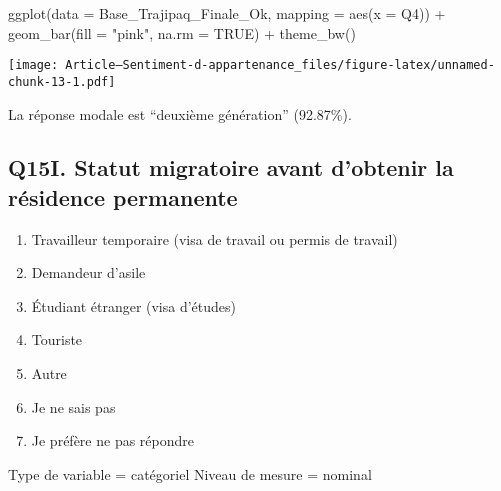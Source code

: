 \documentclass[
]{article}
\newenvironment{Shaded}{\begin{snugshade}}{\end{snugshade}}
\newcommand{\AttributeTok}[1]{\textcolor[rgb]{0.77,0.63,0.00}{#1}}
\newcommand{\ConstantTok}[1]{\textcolor[rgb]{0.00,0.00,0.00}{#1}}
\newcommand{\FunctionTok}[1]{\textcolor[rgb]{0.00,0.00,0.00}{#1}}
\newcommand{\NormalTok}[1]{#1}
\newcommand{\SpecialCharTok}[1]{\textcolor[rgb]{0.00,0.00,0.00}{#1}}
\newcommand{\StringTok}[1]{\textcolor[rgb]{0.31,0.60,0.02}{#1}}
\providecommand{\tightlist}{%
  \setlength{\itemsep}{0pt}\setlength{\parskip}{0pt}}
\begin{document}
\begin{Shaded}
\begin{Highlighting}[]
\FunctionTok{ggplot}\NormalTok{(}\AttributeTok{data =}\NormalTok{ Base\_Trajipaq\_Finale\_Ok, }\AttributeTok{mapping =} \FunctionTok{aes}\NormalTok{(}\AttributeTok{x =}\NormalTok{ Q4)) }\SpecialCharTok{+}
  \FunctionTok{geom\_bar}\NormalTok{(}\AttributeTok{fill =} \StringTok{"pink"}\NormalTok{, }\AttributeTok{na.rm =} \ConstantTok{TRUE}\NormalTok{) }\SpecialCharTok{+}
  \FunctionTok{theme\_bw}\NormalTok{()}
\end{Highlighting}
\end{Shaded}

\texttt{[image: Article---Sentiment-d-appartenance\_files/figure-latex/unnamed-chunk-13-1.pdf]}

La réponse modale est ``deuxième génération'' (92.87\%).

\hypertarget{q15i.-statut-migratoire-avant-dobtenir-la-ruxe9sidence-permanente}{%
\subsection{Q15I. Statut migratoire avant d'obtenir la résidence
permanente}\label{q15i.-statut-migratoire-avant-dobtenir-la-ruxe9sidence-permanente}}

\begin{enumerate}
\def\labelenumi{\arabic{enumi}.}
\tightlist
\item
  Travailleur temporaire (visa de travail ou permis de travail)
\item
  Demandeur d'asile
\item
  Étudiant étranger (visa d'études)
\item
  Touriste
\item
  Autre
\item
  Je ne sais pas
\item
  Je préfère ne pas répondre
\end{enumerate}

Type de variable = catégoriel Niveau de mesure = nominal
\end{document}
